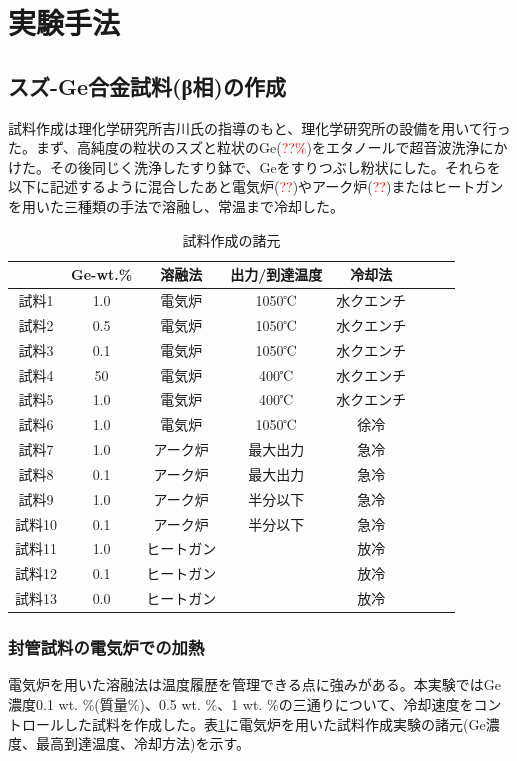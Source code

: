 \section{実験手法}
\subsection{スズ-Ge合金試料(β相)の作成}
試料作成は理化学研究所吉川氏の指導のもと、理化学研究所の設備を用いて行った。まず、高純度の粒状のスズと粒状のGe(\textcolor{red}{??\%})をエタノールで超音波洗浄にかけた。その後同じく洗浄したすり鉢で、Geをすりつぶし粉状にした。それらを以下に記述するように混合したあと電気炉(\textcolor{red}{??})やアーク炉(\textcolor{red}{??})またはヒートガンを用いた三種類の手法で溶融し、常温まで冷却した。
\begin{table}[!h]
    \begin{center}
  \begin{tabular}{c|ccccccc}
&Ge-wt.\%&溶融法&出力/到達温度&冷却法&\\ \hline
試料1&1.0&電気炉&1050℃&水クエンチ&\\
試料2&0.5&電気炉&1050℃&水クエンチ&\\
試料3&0.1&電気炉&1050℃&水クエンチ&\\
試料4&50&電気炉&400℃&水クエンチ&\\
試料5&1.0&電気炉&400℃&水クエンチ&\\
試料6&1.0&電気炉&1050℃&徐冷&\\
試料7&1.0&アーク炉&最大出力&急冷&\\
試料8&0.1&アーク炉&最大出力&急冷&\\
試料9&1.0&アーク炉&半分以下&急冷&\\
試料10&0.1&アーク炉&半分以下&急冷&\\
試料11&1.0&ヒートガン&&放冷&\\
試料12&0.1&ヒートガン&&放冷&\\
試料13&0.0&ヒートガン&&放冷&\\
  \end{tabular}
  \caption{試料作成の諸元}
  \label{tab:sample_prep_elec}
    \end{center}
\end{table}

\subsubsection{封管試料の電気炉での加熱}
電気炉を用いた溶融法は温度履歴を管理できる点に強みがある。本実験ではGe濃度0.1 wt. \%(質量\%)、0.5 wt. \%、1 wt. \%の三通りについて、冷却速度をコントロールした試料を作成した。表\ref{tab:sample_prep_elec}に電気炉を用いた試料作成実験の諸元(Ge濃度、最高到達温度、冷却方法)を示す。

